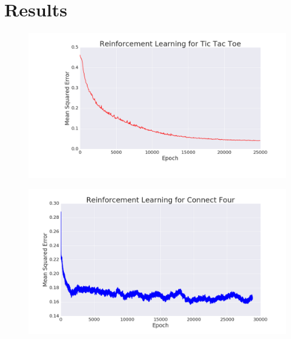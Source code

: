 \section{Results}

\begin{frame}
\begin{figure}
\includegraphics[width=1 \textwidth]{reinforcement_ttt}
\end{figure}
\end{frame}

\begin{frame}
\begin{figure}
\includegraphics[width=1 \textwidth]{reinforcement_c4}
\end{figure}
\end{frame}

